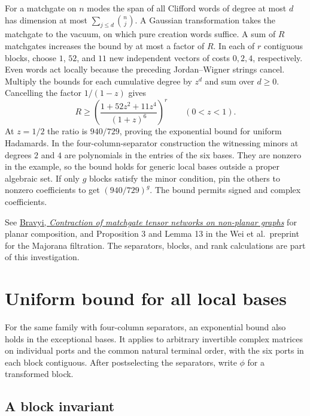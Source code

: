 \documentclass[11pt,a4paper]{article}
\numberwithin{equation}{section}
\begin{document}
For a matchgate on \(n\) modes the span of all Clifford words of degree at most \(d\) has dimension at most \(\sum_{j\le d}\binom nj\). A Gaussian transformation takes the matchgate to the vacuum, on which pure creation words suffice. A sum of \(R\) matchgates increases the bound by at most a factor of \(R\). In each of \(r\) contiguous blocks, choose \(1\), \(52\), and \(11\) new independent vectors of costs \(0,2,4\), respectively. Even words act locally because the preceding Jordan--Wigner strings cancel. Multiply the bounds for each cumulative degree by \(z^d\) and sum over \(d\ge0\). Cancelling the factor \(1/(1-z)\) gives
\begin{equation}\label{eq:generic-rank-bound}
R\ge \left(\frac{1+52z^2+11z^4}{(1+z)^6}\right)^r
\qquad(0<z<1).
\end{equation}
At \(z=1/2\) the ratio is \(940/729\), proving the exponential bound for uniform Hadamards. In the four-column-separator construction the witnessing minors at degrees \(2\) and \(4\) are polynomials in the entries of the six bases. They are nonzero in the example, so the bound holds for generic local bases outside a proper algebraic set. If only \(g\) blocks satisfy the minor condition, pin the others to nonzero coefficients to get \((940/729)^g\). The bound permits signed and complex coefficients.

See \href{https://arxiv.org/abs/0801.2989}{Bravyi, \emph{Contraction of matchgate tensor networks on non-planar graphs}} for planar composition, and Proposition 3 and Lemma 13 in the Wei et al.~preprint for the Majorana filtration. The separators, blocks, and rank calculations are part of this investigation.

\section{Uniform bound for all local bases}\label{uniform-bound-for-all-local-bases}

For the same family with four-column separators, an exponential bound also holds in the exceptional bases. It applies to arbitrary invertible complex matrices on individual ports and the common natural terminal order, with the six ports in each block contiguous. After postselecting the separators, write \(\phi\) for a transformed block.

\subsection{A block invariant}\label{a-block-invariant}
\end{document}
